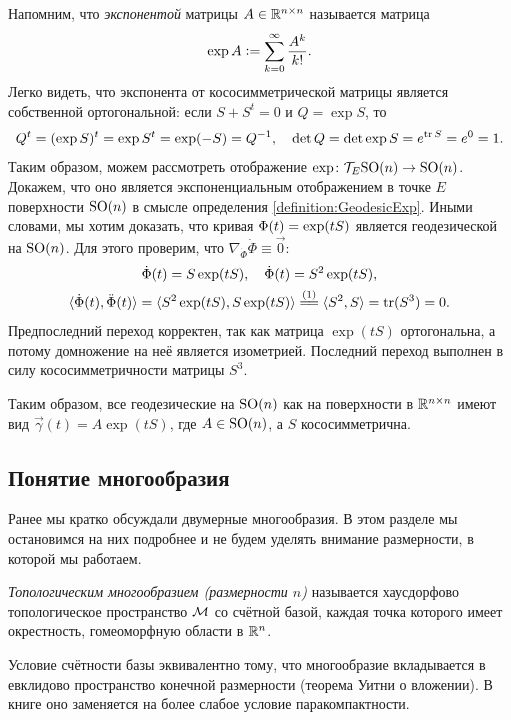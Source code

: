 \begin{solution}
\begin{enumerate}[nolistsep, label=(\arabic*)]
			Напомним, что \textit{экспонентой} матрицы $A \in \mathbb{R}^{n \times n}$ называется матрица
			\[
				\exp A \vcentcolon = \sum_{k = 0}^\infty\frac{A^k}{k!}.
			\]
			Легко видеть, что экспонента от кососимметрической матрицы является собственной ортогональной: если $S + S^t = 0$ и $Q = \exp S$, то
			\[
				Q^t = (\exp S)^t = \exp S^t = \exp(-S) = Q^{-1},\quad \det Q = \det\exp S = e^{\operatorname{tr} S} = e^0 = 1.
			\]
			Таким образом, можем рассмотреть отображение $\exp\colon \mathcal{T}_E\mathrm{SO}(n) \to \mathrm{SO}(n)$. Докажем, что оно является экспоненциальным отображением в точке $E$ поверхности $\mathrm{SO}(n)$ в смысле определения \ref{definition:GeodesicExp}. Иными словами, мы хотим доказать, что кривая $\Phi(t) \hm= \exp(tS)$ является геодезической на $\mathrm{SO}(n)$. Для этого проверим, что $\nabla_{\dot{\Phi}}\dot{\Phi} \equiv \vec{0}$:
			\begin{gather*}
				\dot{\Phi}(t) = S\exp(tS),\quad\dot{\Phi}(t) = S^2\exp(tS),\\
				\langle\dot{\Phi}(t), \ddot{\Phi}(t)\rangle = \langle S^2\exp(tS), S\exp(tS)\rangle \stackrel{(1)}{=\joinrel=} \langle S^2, S\rangle = \tr(S^3) = 0.
			\end{gather*}
			Предпоследний переход корректен, так как матрица $\exp(tS)$ ортогональна, а потому домножение на неё является изометрией. Последний переход выполнен в силу кососимметричности матрицы $S^3$.
	\end{enumerate}

	Таким образом, все геодезические на $\mathrm{SO}(n)$ как на поверхности в $\mathbb{R}^{n \times n}$ имеют вид $\vec{\gamma}(t) = A \exp(tS)$, где $A \in \mathrm{SO}(n)$, а $S$ кососимметрична.
\end{solution}

\subsection{Понятие многообразия}

Ранее мы кратко обсуждали двумерные многообразия. В этом разделе мы остановимся на них подробнее и не будем уделять внимание размерности, в которой мы работаем.

\begin{definition}
	\textit{Топологическим многообразием \textup{(}размерности $n$\textup{)}} называется хаусдорфово топологическое пространство $\mathcal{M}$ со счётной базой, каждая точка которого имеет окрестность, гомеоморфную области в $\mathbb{R}^n$.
\end{definition}

Условие счётности базы эквивалентно тому, что многообразие вкладывается в евклидово пространство конечной размерности (теорема Уитни о вложении). В книге \cite{S19} оно заменяется на более слабое условие паракомпактности.


